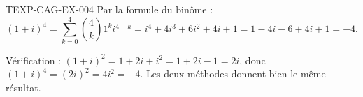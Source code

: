 \begin{corrige}{TEXP-CAG-EX-004}
Par la formule du binôme :
\[
  (1+i)^4 = \sum_{k=0}^4 \binom{4}{k}1^k i^{4-k} = i^4+4i^3+6i^2+4i+1 = 1-4i-6+4i+1 = -4.
\]

Vérification : $(1+i)^2 = 1+2i+i^2 = 1+2i-1 = 2i$, donc $(1+i)^4 = (2i)^2 = 4i^2 = -4$. Les deux méthodes donnent bien le même résultat.
\end{corrige}
